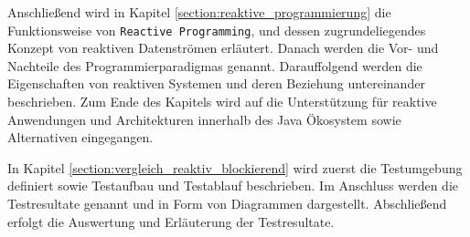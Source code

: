 Anschließend wird in Kapitel \ref{section:reaktive_programmierung} die Funktionsweise von \verb|Reactive Programming|, und dessen
zugrundeliegendes Konzept von reaktiven Datenströmen erläutert. Danach werden die Vor- und Nachteile des Programmierparadigmas
genannt.
Darauffolgend werden die Eigenschaften von reaktiven Systemen und deren Beziehung untereinander beschrieben.
Zum Ende des Kapitels wird auf die Unterstützung für reaktive Anwendungen und Architekturen innerhalb des Java Ökosystem
sowie Alternativen eingegangen.

In Kapitel \ref{section:vergleich_reaktiv_blockierend} wird zuerst die Testumgebung definiert sowie Testaufbau und Testablauf beschrieben.
Im Anschluss werden die Testresultate genannt und in Form von Diagrammen dargestellt.
Abschließend erfolgt die Auswertung und Erläuterung der Testresultate.